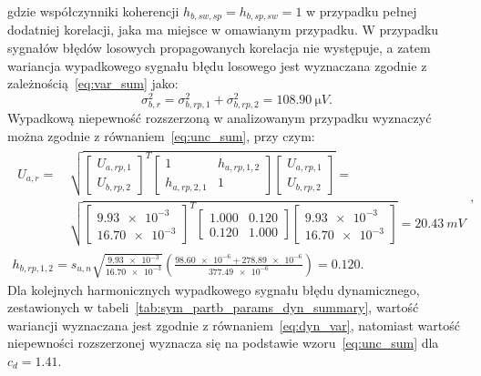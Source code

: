 gdzie współczynniki koherencji $h_{b,sw,sp} = h_{b,sp,sw} = 1$ w przypadku pełnej dodatniej korelacji, jaka ma miejsce w omawianym przypadku. W przypadku sygnałów błędów losowych propagowanych korelacja nie występuje, a zatem wariancja wypadkowego sygnału błędu losowego jest wyznaczana zgodnie z zależnością~\eqref{eq:var_sum} jako:
\begin{equation}
\sigma_{b,r}^{2} = \sigma_{b,rp,1}^{2} + \sigma_{b,rp,2}^{2} = \qty{108.90}{\micro V} \label{eq:sym_partb_rand_var}.
\end{equation}
Wypadkową niepewność rozszerzoną w analizowanym przypadku wyznaczyć można zgodnie z równaniem~\eqref{eq:unc_sum}, przy czym:
\begin{gather}
\begin{split}
U_{a,r} = ~ & \sqrt{
\begin{bmatrix}
U_{a,rp,1} \\ U_{b,rp,2}
\end{bmatrix}^{T}
\begin{bmatrix}
1            & h_{a,rp,1,2} \\
h_{a,rp,2,1} & 1
\end{bmatrix}
\begin{bmatrix}
U_{a,rp,1} \\ U_{b,rp,2}
\end{bmatrix}} = ~ \\ & \sqrt{
\begin{bmatrix}
\num{9.93e-3} \\ \num{16.70e-3}
\end{bmatrix}^{T}
\begin{bmatrix}
\num{1.000} & \num{0.120} \\
\num{0.120} & \num{1.000}
\end{bmatrix}
\begin{bmatrix}
\num{9.93e-3} \\ \num{16.70e-3}
\end{bmatrix}} = \qty{20.43}{mV}
\end{split}
\label{eq:sym_partb_rand_uncert}, \\
h_{b,rp,1,2} = s_{u,n} \sqrt{\frac{\num{9.93e-3}}{\num{16.70e-3}}} \left( \frac{\num{98.60e-6} + \num{278.89e-6}}{\num{377.49e-6}} \right) = \num{0.120} \label{eq:sym_partb_coher_rp_1_2}.
\end{gather}
Dla kolejnych harmonicznych wypadkowego sygnału błędu dynamicznego, zestawionych w tabeli~\ref{tab:sym_partb_params_dyn_summary}, wartość wariancji wyznaczana jest zgodnie z równaniem~\eqref{eq:dyn_var}, natomiast wartość niepewności rozszerzonej wyznacza się na podstawie wzoru~\eqref{eq:unc_sum} dla $c_{d} = \num{1.41}$.

